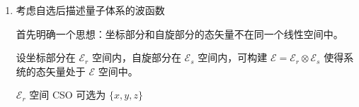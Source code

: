 \documentclass[lang=cn,10pt]{elegantbook}
\begin{document}
\begin{enumerate}
	\[
	\hat{S}_y = \frac{\hbar}{2} \begin{bmatrix} 0 & -i \\ i & 0 \end{bmatrix} = \frac{\hbar}{2} \hat{\sigma}_y
	\]
	
	$\hat{\sigma}_i$ 称为 Pauli 矩阵
	
	$\{\hat{S}^2, \hat{S}_z\}$ 表象也称为 $\hat{\sigma}_z$ 表象 (Pauli 表象)
	
	\begin{enumerate}
		\item $[\hat{S}_\alpha, \hat{S}_\beta] = i\hbar \epsilon_{\alpha \beta \gamma} \hat{S}_\gamma$
		\item $\{\hat{\sigma}_\alpha, \hat{\sigma}_\beta\} = \hat{\sigma}_\alpha \hat{\sigma}_\beta + \hat{\sigma}_\beta \hat{\sigma}_\alpha = 2\delta_{\alpha\beta}\hat{I}$
		\item
		\begin{align*}
			\hat{S}_z |\uparrow\rangle &= \frac{\hbar}{2}|\uparrow\rangle \\
			\hat{S}_x |\uparrow\rangle &= \frac{\hbar}{2}|\downarrow\rangle \\
			\hat{S}_y |\uparrow\rangle &= \frac{i\hbar}{2}|\downarrow\rangle \\
			\hat{S}_z |\downarrow\rangle &= -\frac{\hbar}{2}|\downarrow\rangle \\
			\hat{S}_x |\downarrow\rangle &= \frac{\hbar}{2}|\uparrow\rangle \\
			\hat{S}_y |\downarrow\rangle &= -\frac{i\hbar}{2}|\uparrow\rangle
		\end{align*}
		\item 完备性：任意的 $2 \times 2$ 矩阵都可以用 $\{\hat{I},\hat{\sigma}_x, \hat{\sigma}_y, \hat{\sigma}_z\}$ 来展开
		\item General Euler formula: $e^{i\alpha \hat{\sigma}_3} = \cos(\alpha)\hat{I} + i \hat{\sigma}_3 \sin(\alpha)$
	\end{enumerate}
	
	\item 考虑自选后描述量子体系的波函数
	
	首先明确一个思想：坐标部分和自旋部分的态矢量不在同一个线性空间中。
	
	设坐标部分在 $\mathcal{E}_r$ 空间内，自旋部分在 $\mathcal{E}_s$ 空间内，可构建 $\mathcal{E} = \mathcal{E}_r \otimes \mathcal{E}_s$ 使得系统的态矢量处于 $\mathcal{E}$ 空间中。
	
	$\mathcal{E}_r$ 空间 CSO 可选为 $\{x, y, z\}$
	

\end{enumerate}
\end{document}
